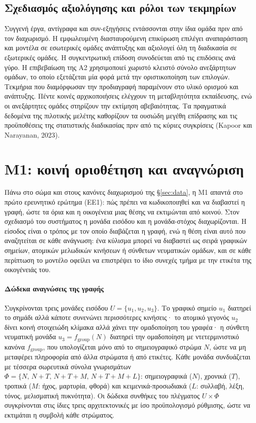 \documentclass[a4paper]{article}
\begin{document}
\subsection{Σχεδιασμός αξιολόγησης και ρόλοι των τεκμηρίων}\label{sec:design}
Συγγενή έργα, αντίγραφα και συν-εξηγήσεις εντάσσονται στην ίδια ομάδα πριν από τον διαχωρισμό. Η εμφωλευμένη διασταυρούμενη επικύρωση επιλέγει αναπαράσταση και μοντέλα σε εσωτερικές ομάδες ανάπτυξης και αξιολογεί όλη τη διαδικασία σε εξωτερικές ομάδες. Η συγκεντρωτική επίδοση συνοδεύεται από τις επιδόσεις ανά γύρο. Η επιβεβαίωση της Α2 χρησιμοποιεί χωριστό κλειστό σύνολο ανεξάρτητων ομάδων, το οποίο εξετάζεται μία φορά μετά την οριστικοποίηση των επιλογών. Τεκμήρια που διαμόρφωσαν την προδιαγραφή παραμένουν στο υλικό ορισμού και ανάπτυξης. Πέντε κοινές αρχικοποιήσεις ελέγχουν τη μεταβλητότητα εκπαίδευσης, ενώ οι ανεξάρτητες ομάδες στηρίζουν την εκτίμηση αβεβαιότητας. Τα πραγματικά δεδομένα της πιλοτικής μελέτης καθορίζουν τα ουσιώδη μεγέθη επίδρασης και τις προϋποθέσεις της στατιστικής διαδικασίας πριν από τις κύριες συγκρίσεις (Kapoor και Narayanan, 2023).

\section{Μ1: κοινή οριοθέτηση και αναγνώριση}\label{sec:m1}
Πάνω στο σώμα και στους κανόνες διαχωρισμού της §\ref{sec:data}, η Μ1 απαντά στο πρώτο ερευνητικό ερώτημα (ΕΕ1): πώς πρέπει να κωδικοποιηθεί και να διαβαστεί η γραφή, ώστε τα όρια και η οικογένεια μιας θέσης να εκτιμώνται από κοινού. Στον σχεδιασμό του συστήματος η μονάδα εισόδου και η μονάδα-στόχος διαχωρίζονται. Η είσοδος είναι ο τρόπος με τον οποίο διαβάζεται η γραφή, ενώ η θέση είναι αυτό που αναζητείται σε κάθε ανάγνωση: ένα κύλισμα μπορεί να διαβαστεί ως σειρά γραφικών σημείων, ατομικών μελωδικών κινήσεων ή σύνθετων νευματικών ομάδων, και σε κάθε περίπτωση το μοντέλο οφείλει να επιστρέψει το ίδιο συνεχές τμήμα με την ετικέτα της οικογένειάς του.

\paragraph{Δώδεκα αναγνώσεις της γραφής}
Συγκρίνονται τρεις μονάδες εισόδου $U=\{u_1,u_2,u_3\}$. Το γραφικό σημείο $u_1$ διατηρεί το σημάδι αλλά κάποτε συνενώνει περισσότερες κινήσεις· το ατομικό γεγονός $u_2$ δίνει κοινή στοιχειώδη κλίμακα αλλά χάνει την ομαδοποίηση του γραφέα· η σύνθετη νευματική μονάδα $u_3=f_{\mathrm{group}}(N)$ διατηρεί την ομαδοποίηση με ντετερμινιστικό κανόνα $f_{\mathrm{group}}$, που υπολογίζεται μόνο από το σημειογραφικό στρώμα $N$, ώστε να μη μεταφέρει πληροφορία από άλλα στρώματα ή από ετικέτες. Κάθε μονάδα συνδυάζεται με τέσσερα σωρευτικά σύνολα γνωρισμάτων $\Phi=\{N,\,N{+}T,\,N{+}T{+}M,\,N{+}T{+}M{+}L\}$: σημειογραφικά ($N$), χρονικά ($T$), τροπικά ($M$: ήχος, μαρτυρία, φθορά) και κειμενικά-προσωδιακά ($L$: συλλαβή, λέξη, τόνος, μελισματική πυκνότητα). Οι δώδεκα συνθήκες του πλέγματος $U\times\Phi$ συγκρίνονται στις ίδιες τρεις αρχιτεκτονικές με ίσο προϋπολογισμό ρύθμισης, ώστε να εκτιμάται η συμβολή κάθε στρώματος.
\end{document}
